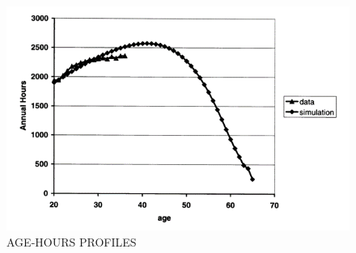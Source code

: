 \hypertarget{AgeHoursProfiles}{}
\begin{figure}[tbp]
  \centerline{\includegraphics[width=6in]{../FigDir/Figure4.png}}
  \caption{AGE-HOURS PROFILES}
  \label{fig:AgeHoursProfiles}
\end{figure}
